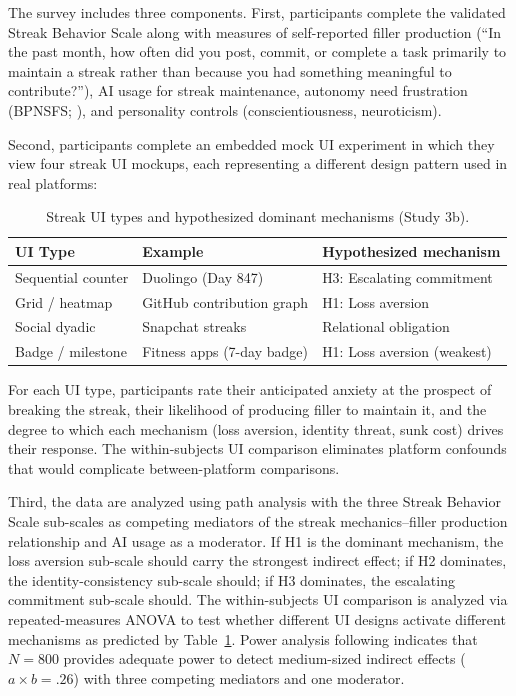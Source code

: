 \documentclass[12pt]{article}
\begin{document}
The survey includes three components. First, participants complete the validated Streak Behavior Scale along with measures of self-reported filler production (``In the past month, how often did you post, commit, or complete a task primarily to maintain a streak rather than because you had something meaningful to contribute?''), AI usage for streak maintenance, autonomy need frustration (BPNSFS; \citealp{Chen2015}), and personality controls (conscientiousness, neuroticism).

Second, participants complete an embedded mock UI experiment in which they view four streak UI mockups, each representing a different design pattern used in real platforms:

\begin{table}[ht]
\centering
\caption{Streak UI types and hypothesized dominant mechanisms (Study 3b).}
\label{tab:ui-types}
\begin{tabular}{lll}
\toprule
UI Type & Example & Hypothesized mechanism \\
\midrule
Sequential counter & Duolingo (Day 847) & H3: Escalating commitment \\
Grid / heatmap & GitHub contribution graph & H1: Loss aversion \\
Social dyadic & Snapchat streaks & Relational obligation \\
Badge / milestone & Fitness apps (7-day badge) & H1: Loss aversion (weakest) \\
\bottomrule
\end{tabular}
\end{table}

For each UI type, participants rate their anticipated anxiety at the prospect of breaking the streak, their likelihood of producing filler to maintain it, and the degree to which each mechanism (loss aversion, identity threat, sunk cost) drives their response. The within-subjects UI comparison eliminates platform confounds that would complicate between-platform comparisons.

Third, the data are analyzed using path analysis with the three Streak Behavior Scale sub-scales as competing mediators of the streak mechanics--filler production relationship and AI usage as a moderator. If H1 is the dominant mechanism, the loss aversion sub-scale should carry the strongest indirect effect; if H2 dominates, the identity-consistency sub-scale should; if H3 dominates, the escalating commitment sub-scale should. The within-subjects UI comparison is analyzed via repeated-measures ANOVA to test whether different UI designs activate different mechanisms as predicted by Table~\ref{tab:ui-types}. Power analysis following \citet{Fritz2007} indicates that $N = 800$ provides adequate power to detect medium-sized indirect effects ($a \times b = .26$) with three competing mediators and one moderator.
\end{document}
